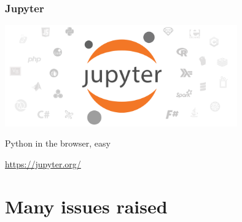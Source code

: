 \documentclass[17pt,aspectratio=169,hyperref={pdfusetitle,colorlinks,allcolors=olive}]{beamer}
\begin{document}
\begin{frame}[fragile]
  \frametitle{Jupyter}

  \begin{center}
    \includegraphics[width=10cm]{figs/jupyter}
  \end{center}

  Python in the browser, easy

  \begin{flushright}
    {\small
      \url{https://jupyter.org/}
    }
  \end{flushright}
\end{frame}


\section{Many issues raised}
\end{document}
